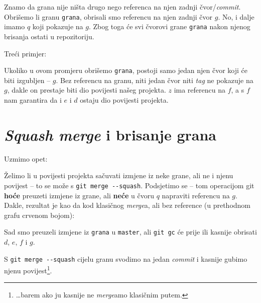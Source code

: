 Znamo da grana nije ništa drugo nego referenca na njen zadnji čvor/\emph{commit}.
Obrišemo li granu \verb+grana+, obrisali smo referencu na njen zadnji čvor $g$.
No, i dalje imamo $q$ koji pokazuje na $g$.
Zbog toga će svi čvorovi grane \verb+grana+ nakon njenog brisanja ostati u repozitoriju.

Treći primjer:



Ukoliko u ovom promjeru obrišemo \verb+grana+, postoji samo jedan njen čvor koji će biti izgubljen -- $g$.
Bez referencu na granu, niti jedan čvor niti \emph{tag} ne pokazuje na $g$, dakle on prestaje biti dio povijesti našeg projekta.
$z$ ima referencu na $f$, a s $f$ nam garantira da i $e$ i $d$ ostaju dio povijesti projekta.

\section*{\emph{Squash merge} i brisanje grana}

Uzmimo opet:



Želimo li u povijesti projekta sačuvati izmjene iz neke grane, ali ne i njenu povijest -- to se može s \verb+git merge --squash+.
Podsjetimo se -- tom operacijom git \textbf{hoće} preuzeti izmjene iz grane, ali \textbf{neće} u čvoru $q$ napraviti referencu na $g$.
Dakle, rezultat je kao da kod klasičnog \emph{merge}a, ali bez reference (u prethodnom grafu crvenom bojom):



Sad smo preuzeli izmjene iz \verb+grana+ u \verb+master+, ali \verb+git gc+ će prije ili kasnije obrisati $d$, $e$, $f$ i $g$.

S \verb+git merge --squash+ cijelu granu svodimo na jedan \emph{commit} i kasnije gubimo njenu povijest\footnote{\dots{}barem ako ju kasnije ne \emph{merge}amo klasičnim putem.}.
